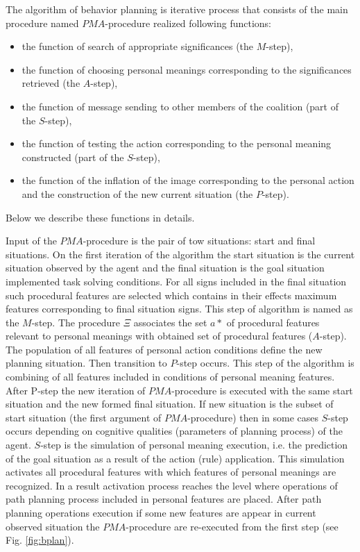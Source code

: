 \documentclass[runningheads,a4paper]{llncs}
\begin{document}
The algorithm of behavior planning is iterative process that consists of the main procedure named $PMA$-procedure realized following functions:
\begin{itemize}
	\item the function of search of appropriate significances (the $M$-step), 
	\item the function of choosing personal meanings corresponding to the significances retrieved (the $A$-step), 
	\item the function of message sending to other members of the coalition (part of the $S$-step),
	\item the function of testing the action corresponding to the personal meaning constructed (part of the $S$-step),
	\item the function of the inflation of the image corresponding to the personal action and the construction of the new current situation (the $P$-step).
\end{itemize}
Below we describe these functions in details.

Input of the $PMA$-procedure is the pair of tow situations: start and final situations. On the first iteration of the algorithm the start situation is the current situation observed by the agent and the final situation is the goal situation implemented task solving conditions. For all signs included in the final situation such procedural features are selected which contains in their effects maximum features corresponding to final situation signs. This step of algorithm is named as the $M$-step. The procedure $\Xi$ associates the set $a*$ of procedural features relevant to personal meanings with obtained set of procedural features ($A$-step). The population of all features of personal action conditions define the new planning situation. Then transition to $P$-step occurs. This step of the algorithm is combining of all features included in conditions of personal meaning features. After P-step the new iteration of $PMA$-procedure is executed with the same start situation and the new formed final situation. If new situation is the subset of start situation (the first argument of $PMA$-procedure) then in some cases $S$-step occurs depending on cognitive qualities (parameters of planning process) of the agent. $S$-step is the simulation of personal meaning execution, i.e. the prediction of the goal situation as a result of the action (rule) application. This simulation activates all procedural features with which features of personal meanings are recognized. In a result activation process reaches the level where operations of path planning process included in personal features are placed. After path planning operations execution if some new features are appear in current observed situation the $PMA$-procedure are re-executed from the first step (see Fig. \ref{fig:bplan}).
\end{document}
